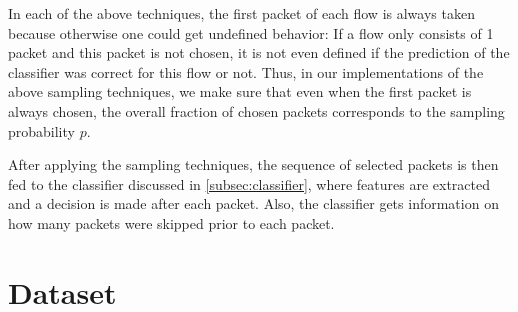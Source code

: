 \documentclass[conference]{IEEEtran}
\newcommand\note[2]{{\color{#1}#2}}
\begin{document}
In each of the above techniques, the first packet of each flow is always taken because otherwise one could get undefined behavior: If a flow only consists of 1 packet and this packet is not chosen, it is not even defined if the prediction of the classifier was correct for this flow or not. Thus, in our implementations of the above sampling techniques, we make sure that even when the first packet is always chosen, the overall fraction of chosen packets corresponds to the sampling probability $p$.

After applying the sampling techniques, the sequence of selected packets is then fed to the classifier discussed in \autoref{subsec:classifier}, where features are extracted and a decision is made after each packet. Also, the classifier gets information on how many packets were skipped prior to each packet.


\section{Dataset}

\end{document}
